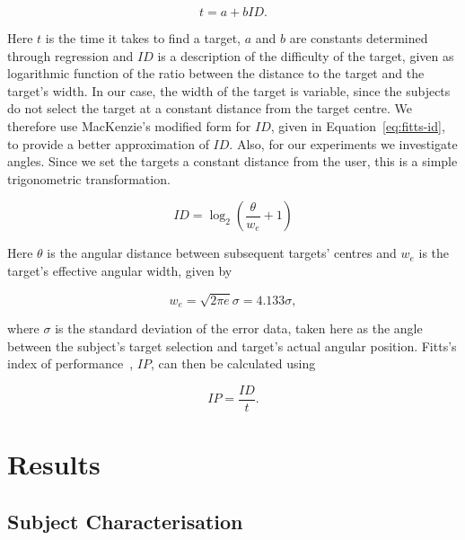 \documentclass[format=sigconf, review=true, screen=true, anonymous=true]{acmart}
\begin{document}
\begin{equation}
  \label{eq:fitts-base}
  t = a + bID.%
\end{equation}


Here $t$ is the time it takes to find a target, $a$ and $b$ are constants determined through regression and $ID$ is a description of the difficulty of the target, given as logarithmic function of the ratio between the distance to the target and the target's width. In our case, the width of the target is variable, since the subjects do not select the target at a constant distance from the target centre. We therefore use MacKenzie's modified form for $ID$, given in Equation~\ref{eq:fitts-id}, to provide a better approximation of $ID$. Also, for our experiments we investigate angles. Since we set the targets a constant distance from the user, this is a simple trigonometric transformation.

\begin{equation}
  \label{eq:fitts-id}
  ID = \log_2\left(\frac{\theta}{w_e} + 1\right)
\end{equation}

Here $\theta$ is the angular distance between subsequent targets' centres and $w_e$ is the target's effective angular width, given by

\begin{equation}
  w_e = \sqrt{2\pi e}\sigma = 4.133\sigma,
\end{equation}

\noindent
where $\sigma$ is the standard deviation of the error data, taken here as the angle between the subject's target selection and target's actual angular position. Fitts's index of performance~\cite[p.~390]{fitts1954information}, $IP$, can then be calculated using 

\begin{equation}
  \label{eq:fitts-performance}
  IP = \frac{ID}{t}.
\end{equation}

\section{Results}
\label{sec:results}

\subsection{Subject Characterisation}
\label{sec:character}
\end{document}
